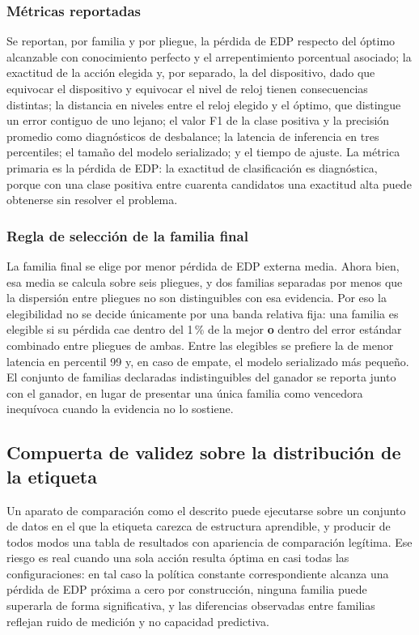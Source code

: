 \documentclass[12pt,oneside,spanish]{book}
\begin{document}
\subsubsection*{Métricas reportadas}

Se reportan, por familia y por pliegue, la pérdida de EDP respecto del óptimo alcanzable con conocimiento perfecto y el arrepentimiento porcentual asociado; la exactitud de la acción elegida y, por separado, la del dispositivo, dado que equivocar el dispositivo y equivocar el nivel de reloj tienen consecuencias distintas; la distancia en niveles entre el reloj elegido y el óptimo, que distingue un error contiguo de uno lejano; el valor F1 de la clase positiva y la precisión promedio como diagnósticos de desbalance; la latencia de inferencia en tres percentiles; el tamaño del modelo serializado; y el tiempo de ajuste. La métrica primaria es la pérdida de EDP: la exactitud de clasificación es diagnóstica, porque con una clase positiva entre cuarenta candidatos una exactitud alta puede obtenerse sin resolver el problema.

\subsubsection*{Regla de selección de la familia final}

La familia final se elige por menor pérdida de EDP externa media. Ahora bien, esa media se calcula sobre seis pliegues, y dos familias separadas por menos que la dispersión entre pliegues no son distinguibles con esa evidencia. Por eso la elegibilidad no se decide únicamente por una banda relativa fija: una familia es elegible si su pérdida cae dentro del 1\,\% de la mejor \textbf{o} dentro del error estándar combinado entre pliegues de ambas. Entre las elegibles se prefiere la de menor latencia en percentil 99 y, en caso de empate, el modelo serializado más pequeño. El conjunto de familias declaradas indistinguibles del ganador se reporta junto con el ganador, en lugar de presentar una única familia como vencedora inequívoca cuando la evidencia no lo sostiene.

\subsection{Compuerta de validez sobre la distribución de la etiqueta}
\label{sec:fase2-compuerta}

Un aparato de comparación como el descrito puede ejecutarse sobre un conjunto de datos en el que la etiqueta carezca de estructura aprendible, y producir de todos modos una tabla de resultados con apariencia de comparación legítima. Ese riesgo es real cuando una sola acción resulta óptima en casi todas las configuraciones: en tal caso la política constante correspondiente alcanza una pérdida de EDP próxima a cero por construcción, ninguna familia puede superarla de forma significativa, y las diferencias observadas entre familias reflejan ruido de medición y no capacidad predictiva.
\end{document}
